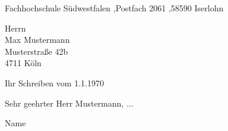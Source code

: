 \documentclass[a4paper, 10pt, parskip=off, headheight=25mm, footheight=25mm]{scrartcl}
\newcommand{\name}{{{Name}}}
\newcommand{\postfach}{Fachhochschule Südwestfalen \sep Postfach 2061 \sep 58590 Iserlohn}
\begin{document}
\begin{anschreiben}

\begin{absender}
\postfach
\end{absender}

\begin{empfaenger}
{{Herrn \\ Max Mustermann \\ Musterstraße 42b \\ 4711 Köln }}
\end{empfaenger}

\begin{betreff}
{{Ihr Schreiben vom 1.1.1970}}
\end{betreff}

\begin{text}
{{Sehr geehrter Herr Mustermann, ... }}
\end{text}

\vspace{15mm}
\name

\end{anschreiben}
\end{document}
